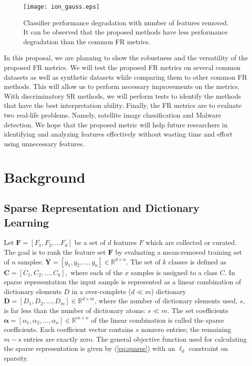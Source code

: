 \documentclass[11pt]{article}
\begin{document}
\begin{figure}[!t]
    \centering
    \texttt{[image: ion\_gauss.eps]}
    \caption{Classifier performance degradation with number of features removed. It can be observed that the proposed methods have less performance degradation than the common FR metrics.}
    \label{fig: FR_degradation}
\end{figure}

In this proposal, we are planning to show the robustness and the versatility of the proposed FR metrics. We will test the proposed FR metrics on several common datasets as well as synthetic datasets while comparing them to other common FR methods. This will allow us to perform necessary improvements on the metrics. With discriminatory SR methods, we will perform tests to identify the methods that have the best interpretation ability. Finally, the FR metrics are to evaluate two real-life problems. Namely, satellite image classification and Malware detection. We hope that the proposed metric will help future researchers in identifying and analyzing features effectively without wasting time and effort using unnecessary features.

\section{Background}

\subsection{Sparse Representation and Dictionary Learning}

Let $\mathbf{F} = [F_1, F_2, \dots F_d]$ be a set of $d$ features $F$ which are collected or curated. The goal is to rank the feature set $\mathbf{F}$ by evaluating a mean-removed training set of $n$ samples: $\mathbf{\bar{Y}} = [y_1, y_2, \dots, y_n] \in \mathbb{R}^{d \times n}$. The set of $k$ classes is defined as $\mathbf{C} = [C_1, C_2, \dots, C_k],$ where each of the $x$ samples is assigned to a class $C$. In sparse representation the input sample is represented as a linear combination of dictionary elements $D$ in a over-complete ($d \ll m$) dictionary $\mathbf{D} = [D_1, D_2, \dots, D_m] \in \mathbb{R}^{d \times m}$, where the number of dictionary elements used, $s$, is far less than the number of dictionary atoms: $s \ll m$. The set coefficients $\bm{\alpha} = [\alpha_1, \alpha_2, \dots, \alpha_n] \in \mathbb{R}^{m \times n}$ of the linear combination is called the sparse coefficients. Each coefficient vector contains $s$ nonzero entries; the remaining $m-s$ entries are exactly zero. The general objective function used for calculating the sparse representation is given by (\ref{eq:sparse}) with an $\ell_0$ constraint on sparsity.
\end{document}
